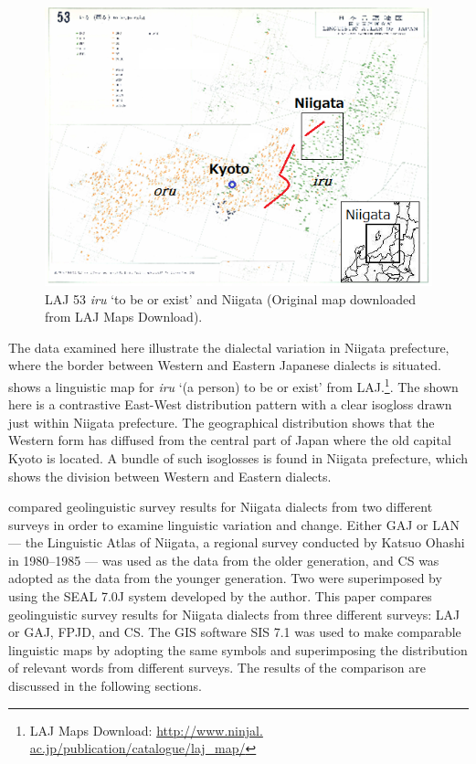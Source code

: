 \documentclass[output=paper]{LSP/langsci}
\begin{document}
\begin{figure}
\includegraphics[width=1\textwidth]{illustrations/fuku2_fig1}
\caption{\textsc{LAJ} 53 \textit{iru} `to be or exist' and Niigata (Original map downloaded from \textsc{LAJ} Maps Download).}
\label{fig:fuku:1}
\end{figure}

The data examined here illustrate the dialectal variation in Niigata prefecture, where the border between Western and Eastern Japanese dialects is situated.  shows a linguistic map for \textit{iru} `(a person) to be or exist' from \textsc{LAJ}.\footnote{\textsc{LAJ} Maps Download: \url{http://www.ninjal. ac.jp/publication/catalogue/laj\_map/}}.  The  shown here is a contrastive East-West distribution pattern with a clear isogloss drawn just within Niigata prefecture.  The geographical distribution shows that the Western form has diffused from the central part of Japan where the old capital Kyoto is located.  A bundle of such isoglosses is found in Niigata prefecture, which shows the division between Western and Eastern dialects.

\largerpage
\citet{fukushima_superimposing_2007} compared geolinguistic survey results for Niigata dialects from two different surveys in order to examine linguistic variation and change.  Either \textsc{GAJ} or LAN --- the Linguistic Atlas of Niigata, a regional survey conducted by Katsuo Ohashi in 1980--1985 \citep{ohashi_linguistic_1998} --- was used as the data from the older generation, and \textsc{CS} was adopted as the data from the younger generation.  Two  were superimposed by using the SEAL 7.0J system developed by the author.  This paper compares geolinguistic survey results for Niigata dialects from three different surveys: \textsc{LAJ} or \textsc{GAJ}, \textsc{FPJD}, and \textsc{CS}.  The \textsc{GIS} software SIS 7.1 was used to make comparable linguistic maps by adopting the same symbols and superimposing the distribution of relevant words from different surveys.  The results of the comparison are discussed in the following sections.
\end{document}
